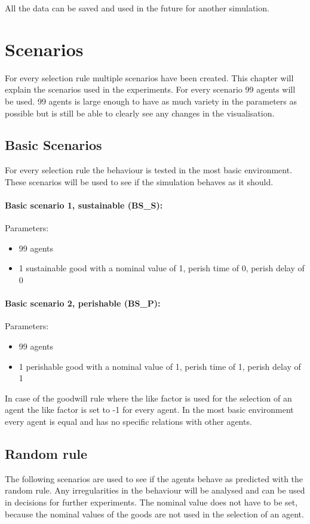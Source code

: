 \documentclass[twoside,openright]{uva-bachelor-thesis}
\begin{document}
All the data can be saved and used in the future for another simulation.


\chapter{Scenarios}
For every selection rule multiple scenarios have been created. This chapter will explain the scenarios used in the experiments. For every scenario 99 agents will be used. 99 agents is large enough to have as much variety in the parameters as possible but is still be able to clearly see any changes in the visualisation.  

\section{Basic Scenarios}
For every selection rule the behaviour is tested in the most basic environment. These scenarios will be used to see if the simulation behaves as it should.
\subsubsection{Basic scenario 1, sustainable (BS\_S):}
Parameters:
\begin{itemize}
\item	99 agents
\item	1 sustainable good with a nominal value of 1, perish time of 0, perish delay of 0
\end{itemize}
\subsubsection{Basic scenario 2, perishable (BS\_P):}
Parameters:
\begin{itemize}
\item	99 agents
\item	1 perishable good with a nominal value of 1, perish time of 1, perish delay of 1
\end{itemize}
In case of the goodwill rule where the like factor is used for the selection of an agent the like factor is set to -1 for every agent. In the most basic environment every agent is equal and has no specific relations with other agents.

\section{Random rule}
The following scenarios are  used to see if the agents behave as predicted with the random rule.  Any irregularities in the behaviour will be analysed and can be used in decisions for further experiments. The nominal value does not have to be set, because the nominal values of the goods are not used in the selection of an agent.
\end{document}
